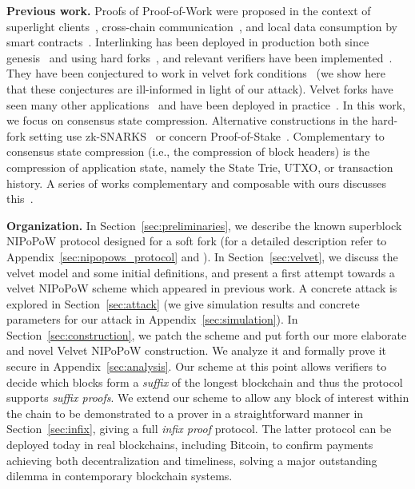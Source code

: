 \noindent
\textbf{Previous work.} Proofs of Proof-of-Work were proposed in the
context of superlight clients~\cite{nipopows,flyclient},
cross-chain communication~\cite{pow-sidechains,burn,crosschain-sok}, and
local data consumption by smart contracts~\cite{derivatives}. Interlinking
has been deployed in production both since genesis~\cite{ergo,nimiq} and using
hard forks~\cite{heartwood-flyclient}, and relevant verifiers have been
implemented~\cite{gglou,nipopow-gas}. They have
been conjectured to work in velvet fork conditions~\cite{nipopows} (we show
here that these conjectures are ill-informed in light of our attack). Velvet forks have seen many other
applications~\cite{velvet} and have been deployed in practice~\cite{gtklocker}. In this work,
we focus on consensus state compression. Alternative constructions in the hard-fork setting use zk-SNARKS~\cite{coda} or concern
Proof-of-Stake~\cite{pos-sidechains}. Complementary to consensus state
compression (i.e., the compression of block headers) is
the compression of application state, namely the State Trie, UTXO, or
transaction history. A series of works complementary and composable with ours
discusses this~\cite{edrax,ethanos}.

\noindent
\textbf{Organization.}
In Section~\ref{sec:preliminaries}, we describe the known superblock NIPoPoW protocol designed for a soft fork (for a detailed description refer to Appendix~\ref{sec:nipopows_protocol} and \cite{nipopows}).
In Section~\ref{sec:velvet}, we discuss the velvet model and
some initial definitions, and present a first attempt towards a velvet
NIPoPoW scheme which appeared in previous work.
A concrete attack is explored
in Section~\ref{sec:attack} (we give simulation results and concrete parameters
for our attack in Appendix~\ref{sec:simulation}). In Section~\ref{sec:construction}, we patch the
scheme and put forth our more elaborate and novel Velvet NIPoPoW construction.
We analyze it and formally prove it secure in Appendix~\ref{sec:analysis}. Our scheme at this
point allows verifiers to decide which blocks form a \emph{suffix} of the
longest blockchain and thus the protocol supports \emph{suffix proofs}. We
extend our scheme to allow any block of interest within the chain to be
demonstrated to a prover in a straightforward manner in
Section~\ref{sec:infix}, giving a full \emph{infix proof} protocol. The latter
protocol can be deployed today in real blockchains,
including Bitcoin, to confirm payments achieving both decentralization and
timeliness, solving a major outstanding dilemma in contemporary blockchain
systems.
